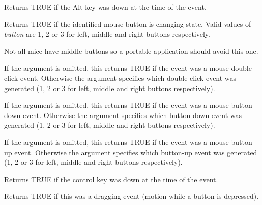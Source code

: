 

Returns TRUE if the Alt key was down at the time of the event.



Returns TRUE if the identified mouse button is changing state. Valid
values of {\it button} are 1, 2 or 3 for left, middle and right
buttons respectively.

Not all mice have middle buttons so a portable application should avoid
this one.

\label{buttondclick}


If the argument is omitted, this returns TRUE if the event was a mouse
double click event. Otherwise the argument specifies which double click event
was generated (1, 2 or 3 for left, middle and right buttons respectively).



If the argument is omitted, this returns TRUE if the event was a mouse
button down event. Otherwise the argument specifies which button-down event
was generated (1, 2 or 3 for left, middle and right buttons respectively).



If the argument is omitted, this returns TRUE if the event was a mouse
button up event. Otherwise the argument specifies which button-up event
was generated (1, 2 or 3 for left, middle and right buttons respectively).



Returns TRUE if the control key was down at the time of the event.



Returns TRUE if this was a dragging event (motion while a button is depressed).

\label{wxmouseevententering}


